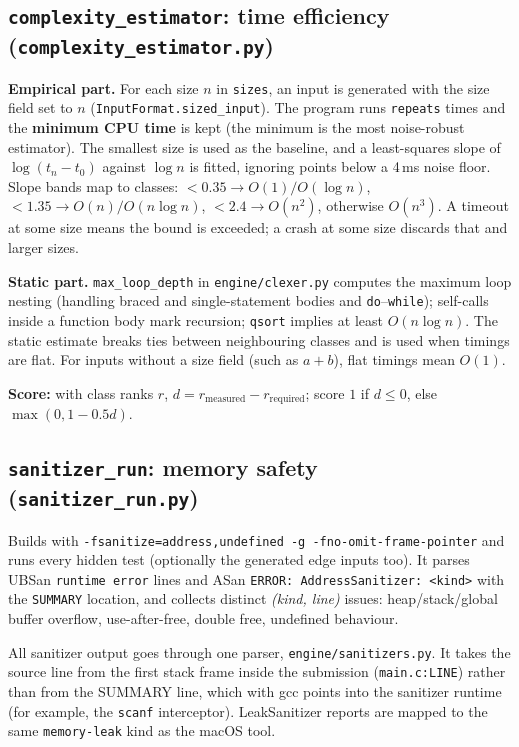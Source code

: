 \documentclass[11pt,a4paper]{article}
\newcommand{\file}[1]{\nolinkurl{#1}}
\newcommand{\fn}[1]{\nolinkurl{#1}}
\begin{document}
\subsection{\texttt{complexity\_estimator}: time efficiency (\texttt{complexity\_estimator.py})}
\textbf{Empirical part.} For each size $n$ in \texttt{sizes}, an input is generated with the size field set to $n$
(\fn{InputFormat.sized_input}). The program runs \texttt{repeats} times and the \textbf{minimum CPU time} is kept
(the minimum is the most noise-robust estimator). The smallest size is used as the baseline, and a
least-squares slope of $\log(t_n - t_0)$ against $\log n$ is fitted, ignoring points below a 4\,ms noise floor.
Slope bands map to classes: $<0.35 \rightarrow O(1)/O(\log n)$, $<1.35 \rightarrow O(n)/O(n\log n)$,
$<2.4 \rightarrow O(n^2)$, otherwise $O(n^3)$. A timeout at some size means the bound is exceeded; a crash at
some size discards that and larger sizes.

\textbf{Static part.} \fn{max_loop_depth} in \file{engine/clexer.py} computes the maximum loop nesting
(handling braced and single-statement bodies and \texttt{do}--\texttt{while}); self-calls inside a function body mark
recursion; \texttt{qsort} implies at least $O(n\log n)$. The static estimate breaks ties between neighbouring
classes and is used when timings are flat. For inputs without a size field (such as $a+b$), flat timings
mean $O(1)$.

\textbf{Score:} with class ranks $r$, $d = r_{\text{measured}} - r_{\text{required}}$; score $1$ if $d \le 0$,
else $\max(0, 1-0.5d)$.

\subsection{\texttt{sanitizer\_run}: memory safety (\texttt{sanitizer\_run.py})}
Builds with \texttt{-fsanitize=address,undefined -g -fno-omit-frame-pointer} and runs every hidden test
(optionally the generated edge inputs too). It parses UBSan \texttt{runtime error} lines and ASan
\texttt{ERROR: AddressSanitizer: <kind>} with the \texttt{SUMMARY} location, and collects distinct
\emph{(kind, line)} issues: heap/stack/global buffer overflow, use-after-free, double free, undefined behaviour.

All sanitizer output goes through one parser, \file{engine/sanitizers.py}. It takes the source line from the
first stack frame inside the submission (\texttt{main.c:LINE}) rather than from the SUMMARY line, which with gcc
points into the sanitizer runtime (for example, the \texttt{scanf} interceptor). LeakSanitizer reports are mapped to the
same \texttt{memory-leak} kind as the macOS tool.
\end{document}

